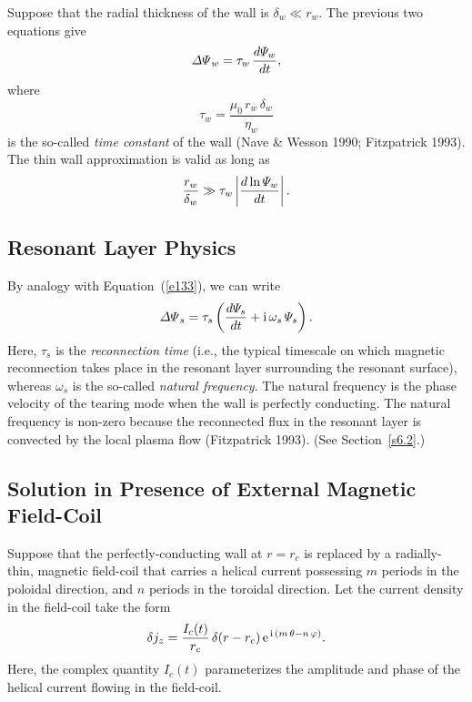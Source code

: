 \documentclass[notitlepage,12pt]{article}
\begin{document}
Suppose that the radial thickness of the wall is $\delta_w\ll r_w$. The previous two equations give
\begin{equation}\label{e133}
{\mit\Delta\Psi}_w = \tau_w\,\frac{d{\mit\Psi}_w}{dt},
\end{equation}
where
\begin{equation}
\tau_w = \frac{\mu_0\,r_w\,\delta_w}{\eta_w}
\end{equation}
is the so-called {\em time constant}\/ of the wall (Nave \& Wesson 1990; Fitzpatrick 1993). The thin wall approximation is
valid as long as
\begin{equation}
\frac{r_w}{\delta_w}\gg \tau_w\left|\frac{d\ln{\mit\Psi}_w}{dt}\right|.
\end{equation}

\subsection{Resonant Layer Physics}\label{sres}
By analogy with Equation~(\ref{e133}), we can write
\begin{equation}\label{e134}
{\mit\Delta\Psi}_s = \tau_s\left(\frac{d{\mit\Psi}_s}{dt} + {\rm i}\,\omega_s\,{\mit\Psi}_s\right).
\end{equation}
Here, $\tau_s$ is the {\em reconnection time}\/ (i.e., the typical timescale on which magnetic reconnection takes place in the
resonant layer surrounding the resonant surface), whereas $\omega_s$ is the so-called {\em natural frequency}. 
The natural frequency is the phase velocity of the tearing mode when the wall is perfectly conducting. The
natural frequency is non-zero because the reconnected flux in the resonant layer is convected by the local plasma
flow (Fitzpatrick 1993). (See Section~\ref{s6.2}.)

\subsection{Solution in Presence of External Magnetic Field-Coil}\label{sfc}
Suppose that the perfectly-conducting wall at $r=r_c$ is replaced by a radially-thin, magnetic field-coil that carries a
helical current possessing $m$ periods in the poloidal direction, and $n$ periods in the toroidal direction. Let the current density in the field-coil
take the form
\begin{equation}\label{e135}
\delta j_z = \frac{I_c(t)}{r_c}\,\delta(r-r_c)\,{\rm e}^{\,{\rm i}\,(m\,\theta-n\,\varphi)}.
\end{equation}
Here, the complex quantity $I_c(t)$ parameterizes the amplitude and phase of the helical current flowing in the field-coil. 
\end{document}
